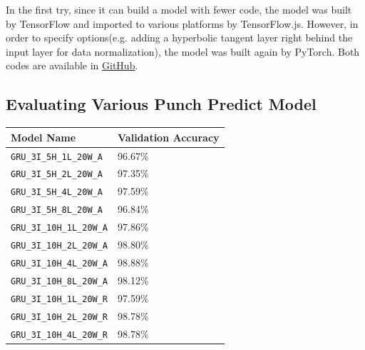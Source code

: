 \documentclass{article}
\begin{document}
    In the first try, since it can build a model with fewer code, the model was built
    by TensorFlow and imported to various platforms by TensorFlow.js. However, in
    order to specify options(e.g. adding a hyperbolic tangent layer right behind
    the input layer for data normalization), the model was built again by
    PyTorch. Both codes are available in \href{https://github.com/punch-boxing/punch-ml/}{GitHub}.

    \FloatBarrier
    \subsection{Evaluating Various Punch Predict Model}
    \begin{table}[ht]
        \begin{center}
            \begin{tabular}{ |p{}|p{}| }
                \hline
                Model Name                        & Validation Accuracy \\
                \hline
                \texttt{GRU\_3I\_5H\_1L\_20W\_A}  & 96.67\%             \\
                \hline
                \texttt{GRU\_3I\_5H\_2L\_20W\_A}  & 97.35\%             \\
                \hline
                \texttt{GRU\_3I\_5H\_4L\_20W\_A}  & 97.59\%             \\
                \hline
                \texttt{GRU\_3I\_5H\_8L\_20W\_A}  & 96.84\%             \\
                \hline
                \texttt{GRU\_3I\_10H\_1L\_20W\_A} & 97.86\%             \\
                \hline
                \texttt{GRU\_3I\_10H\_2L\_20W\_A} & 98.80\%             \\
                \hline
                \texttt{GRU\_3I\_10H\_4L\_20W\_A} & 98.88\%             \\
                \hline
                \texttt{GRU\_3I\_10H\_8L\_20W\_A} & 98.12\%             \\
                \hline
                \texttt{GRU\_3I\_10H\_1L\_20W\_R} & 97.59\%             \\
                \hline
                \texttt{GRU\_3I\_10H\_2L\_20W\_R} & 98.78\%             \\
                \hline
                \texttt{GRU\_3I\_10H\_4L\_20W\_R} & 98.78\%             \\
                \hline

\end{tabular}
\end{center}
\end{table}
\end{document}
